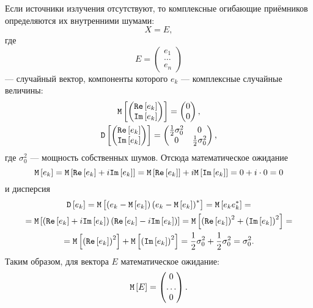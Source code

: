 Если источники излучения отсутствуют, то комплексные огибающие приёмников определяются их внутренними шумами:
\[
    X = E,
\]
где
\[
    E =
    \begin{pmatrix}
        e_1   \\
        \dots \\
        e_n
    \end{pmatrix}
\]
--- случайный вектор, компоненты которого $e_k$ --- комплексные случайные величины:
\begin{gather*}
    \mathtt{M} \left [ 
        \begin{pmatrix}
            \mathtt{Re} \left [ e_k \right ] \\ \mathtt{Im} \left [ e_k \right ]
        \end{pmatrix}
     \right ] =
    \begin{pmatrix}
        0 \\
        0
    \end{pmatrix} , \\
    \mathtt{D} \left [ 
        \begin{pmatrix}
            \mathtt{Re} \left [ e_k \right ] \\ \mathtt{Im} \left [ e_k \right ]
        \end{pmatrix}
     \right ] =
    \begin{pmatrix}
        \frac{1}{2} \sigma_0^2 & 0                      \\
        0                      & \frac{1}{2} \sigma_0^2
    \end{pmatrix} ,
\end{gather*}
где $\sigma_0^2$ --- мощность собственных шумов. Отсюда математическое ожидание
\[
    \mathtt{M} \left [ e_k \right ]
    = \mathtt{M} \left [ \mathtt{Re} \left [ e_k \right ] + i \mathtt{Im} \left [ e_k \right ] \right ]
    = \mathtt{M} \left [ \mathtt{Re} \left [ e_k \right ] \right ] + i \mathtt{M} \left [ \mathtt{Im} \left [ e_k \right ] \right ]
    = 0 + i \cdot 0
    = 0
\]
и дисперсия
\begin{multline*}
    \mathtt{D} \left [ e_k \right ]
    = \mathtt{M} \left [ \left ( e_k - \mathtt{M} \left [ e_k \right ] \right ) \left ( e_k - \mathtt{M} \left [ e_k \right ] \right )^* \right ]
    = \mathtt{M} \left [ e_k e_k^* \right ] = \\
    = \mathtt{M} \left [ \left ( \mathtt{Re} \left [ e_k \right ] + i \mathtt{Im} \left [ e_k \right ] \right ) \left ( \mathtt{Re} \left [ e_k \right ] - i \mathtt{Im} \left [ e_k \right ] \right ) \right ]
    = \mathtt{M} \left [ \left ( \mathtt{Re} \left [ e_k \right ] \right )^2 + \left ( \mathtt{Im} \left [ e_k \right ] \right )^2 \right ] = \\
    = \mathtt{M} \left [ \left ( \mathtt{Re} \left [ e_k \right ] \right )^2 \right ] + \mathtt{M} \left [ \left ( \mathtt{Im} \left [ e_k \right ] \right )^2 \right ]
    = \frac{1}{2} \sigma_0^2 + \frac{1}{2} \sigma_0^2
    = \sigma_0^2 .
\end{multline*}
Таким образом, для вектора $E$ математическое ожидание:
\[
    \mathtt{M} \left [ E \right ]
    = \begin{pmatrix}
          0     \\
          \dots \\
          0
    \end{pmatrix} .
\]
